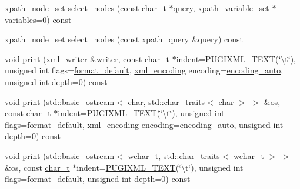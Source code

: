 \begin{DoxyCompactItemize}
\item 
\hyperlink{classpugi_1_1xpath__node__set}{xpath\-\_\-node\-\_\-set} \hyperlink{classpugi_1_1xml__node_a32ade4ad1281495923687321825dbb1b}{select\-\_\-nodes} (const \hyperlink{namespacepugi_aef5a7a62cba0507542220ea15afe39df}{char\-\_\-t} $\ast$query, \hyperlink{classpugi_1_1xpath__variable__set}{xpath\-\_\-variable\-\_\-set} $\ast$variables=0) const 
\item 
\hyperlink{classpugi_1_1xpath__node__set}{xpath\-\_\-node\-\_\-set} \hyperlink{classpugi_1_1xml__node_acc6e39ed181fac7f56e69280ad51fac6}{select\-\_\-nodes} (const \hyperlink{classpugi_1_1xpath__query}{xpath\-\_\-query} \&query) const 
\item 
void \hyperlink{classpugi_1_1xml__node_aed2c5f51a149e116cfe7970c6a5df749}{print} (\hyperlink{classpugi_1_1xml__writer}{xml\-\_\-writer} \&writer, const \hyperlink{namespacepugi_aef5a7a62cba0507542220ea15afe39df}{char\-\_\-t} $\ast$indent=\hyperlink{pugixml_8hpp_ad5475bca2e336810ae5906349e644d0b}{P\-U\-G\-I\-X\-M\-L\-\_\-\-T\-E\-X\-T}(\char`\"{}\textbackslash{}t\char`\"{}), unsigned int flags=\hyperlink{namespacepugi_a325f48a35abbaeacdfd8b7fc9ed1713c}{format\-\_\-default}, \hyperlink{namespacepugi_a03f708f86abeff5fce6842ffd6a0951e}{xml\-\_\-encoding} encoding=\hyperlink{namespacepugi_a03f708f86abeff5fce6842ffd6a0951eae11b2ef666f03e77b7e764e38d22dc17}{encoding\-\_\-auto}, unsigned int depth=0) const 
\item 
void \hyperlink{classpugi_1_1xml__node_a930c02bae5ea9cc206ba358eaff96238}{print} (std\-::basic\-\_\-ostream$<$ char, std\-::char\-\_\-traits$<$ char $>$ $>$ \&os, const \hyperlink{namespacepugi_aef5a7a62cba0507542220ea15afe39df}{char\-\_\-t} $\ast$indent=\hyperlink{pugixml_8hpp_ad5475bca2e336810ae5906349e644d0b}{P\-U\-G\-I\-X\-M\-L\-\_\-\-T\-E\-X\-T}(\char`\"{}\textbackslash{}t\char`\"{}), unsigned int flags=\hyperlink{namespacepugi_a325f48a35abbaeacdfd8b7fc9ed1713c}{format\-\_\-default}, \hyperlink{namespacepugi_a03f708f86abeff5fce6842ffd6a0951e}{xml\-\_\-encoding} encoding=\hyperlink{namespacepugi_a03f708f86abeff5fce6842ffd6a0951eae11b2ef666f03e77b7e764e38d22dc17}{encoding\-\_\-auto}, unsigned int depth=0) const 
\item 
void \hyperlink{classpugi_1_1xml__node_a59a563de9fb47e3916f35f14a77d19a9}{print} (std\-::basic\-\_\-ostream$<$ wchar\-\_\-t, std\-::char\-\_\-traits$<$ wchar\-\_\-t $>$ $>$ \&os, const \hyperlink{namespacepugi_aef5a7a62cba0507542220ea15afe39df}{char\-\_\-t} $\ast$indent=\hyperlink{pugixml_8hpp_ad5475bca2e336810ae5906349e644d0b}{P\-U\-G\-I\-X\-M\-L\-\_\-\-T\-E\-X\-T}(\char`\"{}\textbackslash{}t\char`\"{}), unsigned int flags=\hyperlink{namespacepugi_a325f48a35abbaeacdfd8b7fc9ed1713c}{format\-\_\-default}, unsigned int depth=0) const 

\end{DoxyCompactItemize}
